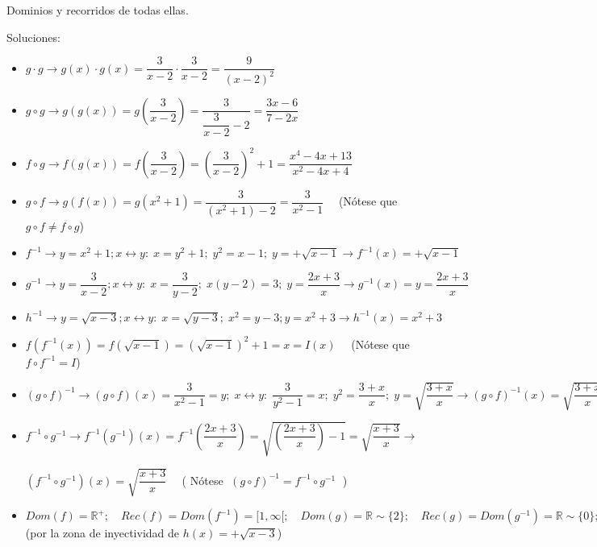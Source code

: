 {\begin{ejre}
		Dominios y recorridos de todas ellas.
		
		\end{ejre}
		
		\begin{proofw}\renewcommand{\qedsymbol}{$\diamond$}
			
		Soluciones:
			
		\begin{itemize}
			
			
			\item [*] $g\cdot g \to g(x)\cdot g(x)= \dfrac {3}{x-2} \cdot \dfrac {3}{x-2} = \dfrac {9}{(x-2)^2}$
			\item [*] $g\circ g \to g(g(x))=g\left( \dfrac {3}{x-2} \right)=\dfrac {3}{\dfrac {3}{x-2}-2}=\dfrac {3x-6}{7-2x}$
			\item [*] $f\circ g \to f(g(x))=f \left( \dfrac {3}{x-2}  \right) = \left( \dfrac {3}{x-2}  \right)^2 +1 = \dfrac {x^4-4x+13}{x^2-4x+4}$
			
			\item [*] $ g\circ f \to g (f(x))=g(x^2+1)=\dfrac {3}{(x^2+1)-2} = \dfrac {3}{x^2-1} \quad  $ (Nótese que $g\circ f \neq f\circ g$)
			
			\item [*] $f^{-1} \to   y=x^2+1; x\leftrightarrow y: \; x=y^2+1; \; y^2=x-1; \; y=+\sqrt{x-1} \to f^{-1}(x)=+\sqrt{x-1}$
			\item [*] $g^{-1} \to  y=\dfrac {3}{x-2}; x\leftrightarrow y: \; x=\dfrac {3}{y-2}; \; x(y-2)=3; \; y=\dfrac {2x+3}{x} \to g^{-1}(x)=y=\dfrac {2x+3}{x}$
			\item [*] $h^{-1} \to y=\sqrt{x-3}; x\leftrightarrow y: \; x=\sqrt{y-3} ; \; x^2=y-3; y=x^2+3 \to h^{-1}(x)=x^2+3 $
			\item [*] $ f \left(f^{-1}(x) \right) =f (\sqrt {x-1})=(\sqrt{x-1})^2+1=x=I(x) \quad$ (Nótese que $f\circ f^{-1}=I$)
			\item [*] $ (g \circ f )^{-1} \to (g\circ f)(x)= \dfrac {3}{x^2-1}=y ; \; x\leftrightarrow y: \; \dfrac {3}{y^2-1}=x; \; y^2=\dfrac {3+x}{x}; \; y= \sqrt {\dfrac {3+x}{x}} \to  (g \circ f )^{-1}(x)=\sqrt {\dfrac {3+x}{x}}$
			\item [*] $f^{-1} \circ g^{-1} \to f^{-1} \left( g^{-1}  \right)(x)= f^{-1} \left( \dfrac {2x+3}{x} \right) = \sqrt{\left( \dfrac {2x+3}{x} \right)-1}= \sqrt{\dfrac {x+3}{x}} \to$
			
			 	$\left( f^{-1} \circ g^{-1} \right)(x)=\sqrt{\dfrac {x+3}{x}}\quad $ ( Nótese $\;(g \circ f )^{-1} =  f^{-1} \circ g^{-1} \; $ )
			 	\item [*] $Dom(f)=\mathbb R^+; \quad Rec(f)=Dom(f^{-1})=[1, \infty[; \quad Dom(g)=\mathbb R \sim \{2\}; \quad Rec(g)=Dom(g^{-1})=\mathbb R \sim \{0\}; \quad Dom(h)=[3,\infty[; \quad Rec(h)=Dom(h^{-1})=\mathbb R^+ \; $(por la zona de inyectividad de $h(x)=+\sqrt{x-3}$)
		\end{itemize}
			

\end{proofw}}
